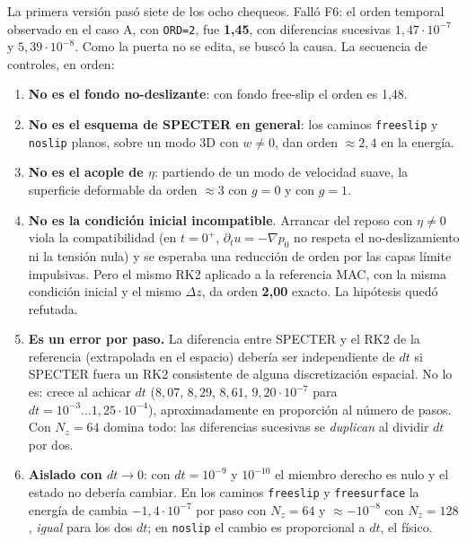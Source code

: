 La primera versión pasó siete de los ocho chequeos. Falló F6: el orden temporal observado
en el caso A, con \texttt{ORD=2}, fue \textbf{1{,}45}, con diferencias sucesivas
$1{,}47\cdot10^{-7}$ y $5{,}39\cdot10^{-8}$. Como la puerta no se edita, se buscó la causa.
La secuencia de controles, en orden:

\begin{enumerate}
\item \textbf{No es el fondo no-deslizante}: con fondo free-slip el orden es 1{,}48.
\item \textbf{No es el esquema de SPECTER en general}: los caminos \texttt{freeslip} y
  \texttt{noslip} planos, sobre un modo 3D con $w\neq0$, dan orden $\approx2{,}4$ en la
  energía.
\item \textbf{No es el acople de $\eta$}: partiendo de un modo de velocidad suave, la
  superficie deformable da orden $\approx3$ con $g=0$ y con $g=1$.
\item \textbf{No es la condición inicial incompatible}. Arrancar del reposo con
  $\eta\neq0$ viola la compatibilidad (en $t=0^+$, $\partial_tu=-\nabla p_0$ no respeta
  el no-deslizamiento ni la tensión nula) y se esperaba una reducción de orden por las
  capas límite impulsivas. Pero el mismo RK2 aplicado a la referencia MAC, con la misma
  condición inicial y el mismo $\Delta z$, da orden \textbf{2{,}00} exacto. La hipótesis
  quedó refutada.
\item \textbf{Es un error por paso.} La diferencia entre SPECTER y el RK2 de la referencia
  (extrapolada en el espacio) debería ser independiente de $dt$ si SPECTER fuera un RK2
  consistente de alguna discretización espacial. No lo es: crece al achicar $dt$
  ($8{,}07$, $8{,}29$, $8{,}61$, $9{,}20\cdot10^{-7}$ para
  $dt=10^{-3}\dots1{,}25\cdot10^{-4}$), aproximadamente en proporción al número de pasos.
  Con $N_z=64$ domina todo: las diferencias sucesivas se \emph{duplican} al dividir $dt$
  por dos.
\item \textbf{Aislado con $dt\to0$}: con $dt=10^{-9}$ y $10^{-10}$ el miembro derecho es
  nulo y el estado no debería cambiar. En los caminos \texttt{freeslip} y
  \texttt{freesurface} la energía de  cambia $-1{,}4\cdot10^{-7}$ por
  paso con $N_z=64$ y $\approx-10^{-8}$ con $N_z=128$, \emph{igual} para los dos $dt$; en
  \texttt{noslip} el cambio es proporcional a $dt$, el físico.
\end{enumerate}

